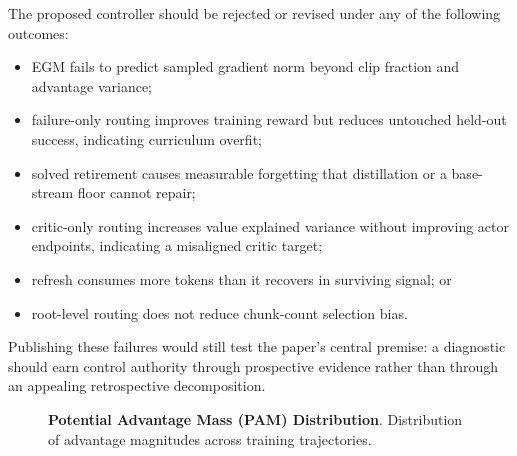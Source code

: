 \documentclass{article}
\begin{document}
The proposed controller should be rejected or revised under any of the
following outcomes:
\begin{itemize}[leftmargin=*]
  \item EGM fails to predict sampled gradient norm beyond clip fraction and
  advantage variance;
  \item failure-only routing improves training reward but reduces untouched
  held-out success, indicating curriculum overfit;
  \item solved retirement causes measurable forgetting that distillation or a
  base-stream floor cannot repair;
  \item critic-only routing increases value explained variance without
  improving actor endpoints, indicating a misaligned critic target;
  \item refresh consumes more tokens than it recovers in surviving signal; or
  \item root-level routing does not reduce chunk-count selection bias.
\end{itemize}
Publishing these failures would still test the paper's central premise: a
diagnostic should earn control authority through prospective evidence rather
than through an appealing retrospective decomposition.



\begin{figure}[htbp]
\centering
{}
\caption{\textbf{Potential Advantage Mass (PAM) Distribution}. Distribution of advantage magnitudes across training trajectories.}
\label{fig:n01_pam_distribution}
\end{figure}
\end{document}
